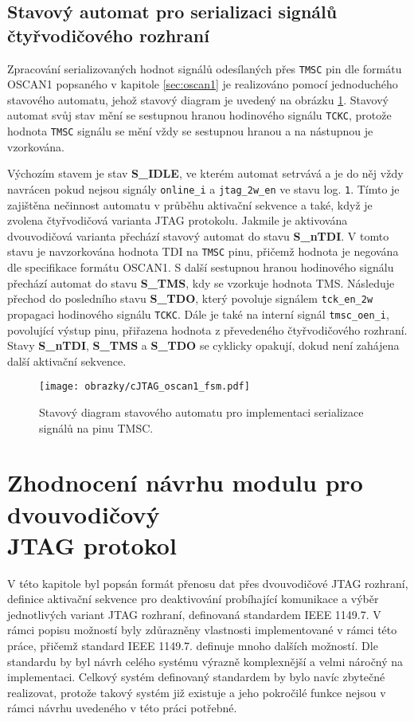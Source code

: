 \subsection{Stavový automat pro serializaci signálů čtyřvodičového rozhraní}	\label{subsec:oscan1_fsm}
Zpracování serializovaných hodnot signálů odesílaných přes \texttt{\acs{TMSC}} pin dle formátu OSCAN1 popsaného v kapitole \ref{sec:oscan1} je realizováno pomocí jednoduchého stavového automatu, jehož stavový diagram je uvedený na obrázku \ref{fig:cJTAG_oscan1_fsm}. Stavový automat svůj stav mění se sestupnou hranou hodinového signálu \texttt{\acs{TCKC}}, protože hodnota \texttt{\acs{TMSC}} signálu se mění vždy se sestupnou hranou a na nástupnou je vzorkována.

Výchozím stavem je stav \textbf{S\_IDLE}, ve kterém automat setrvává a je do něj vždy navrácen pokud nejsou signály \texttt{online\_i} a \texttt{jtag\_2w\_en} ve stavu log. \texttt{1}. Tímto je zajištěna nečinnost automatu v průběhu aktivační sekvence a také, když je zvolena čtyřvodičová varianta \acs{JTAG} protokolu. Jakmile je aktivována dvouvodičová varianta přechází stavový automat do stavu \textbf{S\_nTDI}. V tomto stavu je navzorkována hodnota TDI na \texttt{\acs{TMSC}} pinu, přičemž hodnota je negována dle specifikace formátu OSCAN1. S další sestupnou hranou hodinového signálu přechází automat do stavu \textbf{S\_TMS}, kdy se vzorkuje hodnota TMS. Následuje přechod do posledního stavu \textbf{S\_TDO}, který povoluje signálem \texttt{tck\_en\_2w} propagaci hodinového signálu \texttt{\acs{TCKC}}. Dále je také na interní signál \texttt{tmsc\_oen\_i}, povolující výstup pinu, přiřazena hodnota z převedeného čtyřvodičového rozhraní. Stavy \textbf{S\_nTDI}, \textbf{S\_TMS} a \textbf{S\_TDO} se cyklicky opakují, dokud není zahájena další aktivační sekvence.

\begin{figure}[!h]
  \begin{center}
    \texttt{[image: obrazky/cJTAG\_oscan1\_fsm.pdf]}
  \end{center}
  \caption{Stavový diagram stavového automatu pro implementaci serializace signálů na pinu \acs{TMSC}.}
	\label{fig:cJTAG_oscan1_fsm}
\end{figure}

\section{Zhodnocení návrhu modulu pro dvouvodičový\\ \acs{JTAG} protokol}
V této kapitole byl popsán formát přenosu dat přes dvouvodičové \acs{JTAG} rozhraní, definice aktivační sekvence pro deaktivování probíhající komunikace a výběr jednotlivých variant \acs{JTAG} rozhraní, definovaná standardem IEEE 1149.7. V rámci popisu možností byly zdůrazněny vlastnosti implementované v rámci této práce, přičemž standard IEEE 1149.7. definuje mnoho dalších možností. Dle standardu by byl návrh celého systému výrazně komplexnější a velmi náročný na implementaci. Celkový systém definovaný standardem by bylo navíc zbytečné realizovat, protože takový systém již existuje a jeho pokročilé funkce nejsou v rámci návrhu uvedeného v této práci potřebné.

